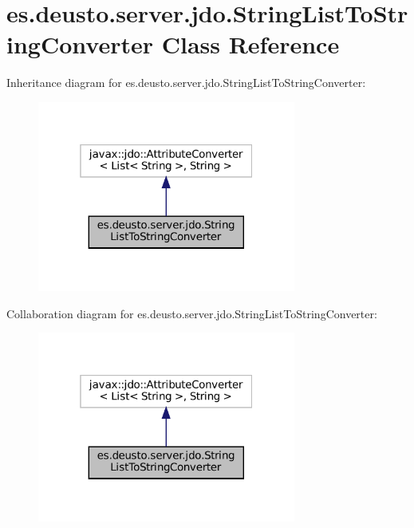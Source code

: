 \hypertarget{classes_1_1deusto_1_1server_1_1jdo_1_1_string_list_to_string_converter}{}\section{es.\+deusto.\+server.\+jdo.\+String\+List\+To\+String\+Converter Class Reference}
\label{classes_1_1deusto_1_1server_1_1jdo_1_1_string_list_to_string_converter}


Inheritance diagram for es.\+deusto.\+server.\+jdo.\+String\+List\+To\+String\+Converter\+:
\nopagebreak
\begin{figure}[H]
\begin{center}
\leavevmode
\includegraphics[width=241pt]{classes_1_1deusto_1_1server_1_1jdo_1_1_string_list_to_string_converter__inherit__graph}
\end{center}
\end{figure}


Collaboration diagram for es.\+deusto.\+server.\+jdo.\+String\+List\+To\+String\+Converter\+:
\nopagebreak
\begin{figure}[H]
\begin{center}
\leavevmode
\includegraphics[width=241pt]{classes_1_1deusto_1_1server_1_1jdo_1_1_string_list_to_string_converter__coll__graph}
\end{center}
\end{figure}
